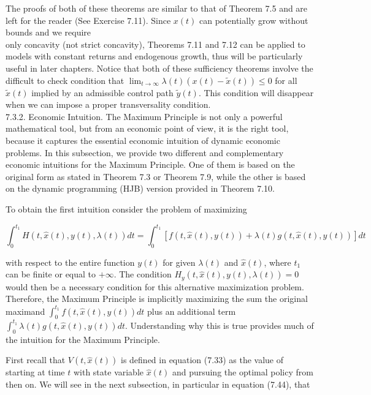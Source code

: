 \documentclass[\topdir/lecture_notes.tex]{subfiles}
\begin{document}
The proofs of both of these theorems are similar to that of Theorem 7.5 and are left for the reader (See Exercise 7.11). Since $x(t)$ can potentially grow without bounds and we require\\
only concavity (not strict concavity), Theorems 7.11 and 7.12 can be applied to models with constant returns and endogenous growth, thus will be particularly useful in later chapters. Notice that both of these sufficiency theorems involve the difficult to check condition that $\lim _{t \rightarrow \infty} \lambda(t)(x(t)-\tilde{x}(t)) \leq 0$ for all $\tilde{x}(t)$ implied by an admissible control path $\tilde{y}(t)$. This condition will disappear when we can impose a proper transversality condition.\\
7.3.2. Economic Intuition. The Maximum Principle is not only a powerful mathematical tool, but from an economic point of view, it is the right tool, because it captures the essential economic intuition of dynamic economic problems. In this subsection, we provide two different and complementary economic intuitions for the Maximum Principle. One of them is based on the original form as stated in Theorem 7.3 or Theorem 7.9, while the other is based on the dynamic programming (HJB) version provided in Theorem 7.10.

To obtain the first intuition consider the problem of maximizing

\[
\int_{0}^{t_{1}} H(t, \hat{x}(t), y(t), \lambda(t)) d t=\int_{0}^{t_{1}}[f(t, \hat{x}(t), y(t))+\lambda(t) g(t, \hat{x}(t), y(t))] d t
\]

with respect to the entire function $y(t)$ for given $\lambda(t)$ and $\hat{x}(t)$, where $t_1$ can be finite or equal to $+\infty$. The condition $H_{y}(t, \hat{x}(t), y(t), \lambda(t))=0$ would then be a necessary condition for this alternative maximization problem. Therefore, the Maximum Principle is implicitly maximizing the sum the original maximand $\int_{0}^{t_{1}} f(t, \hat{x}(t), y(t)) d t$ plus an additional term $\int_{0}^{t_{1}} \lambda(t) g(t, \hat{x}(t), y(t)) d t$. Understanding why this is true provides much of the intuition for the Maximum Principle.

First recall that $V(t, \hat{x}(t))$ is defined in equation (7.33) as the value of starting at time $t$ with state variable $\hat{x}(t)$ and pursuing the optimal policy from then on. We will see in the next subsection, in particular in equation (7.44), that
\end{document}

